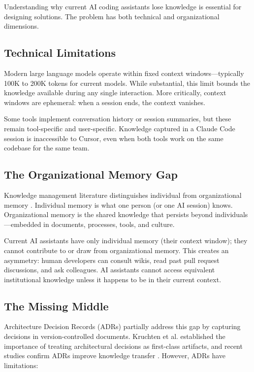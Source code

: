 \documentclass[10pt,journal,compsoc]{IEEEtran}
\begin{document}
Understanding why current AI coding assistants lose knowledge is essential for designing solutions. The problem has both technical and organizational dimensions.

\subsection{Technical Limitations}

Modern large language models operate within fixed context windows---typically 100K to 200K tokens for current models. While substantial, this limit bounds the knowledge available during any single interaction. More critically, context windows are ephemeral: when a session ends, the context vanishes.

Some tools implement conversation history or session summaries, but these remain tool-specific and user-specific. Knowledge captured in a Claude Code session is inaccessible to Cursor, even when both tools work on the same codebase for the same team.

\subsection{The Organizational Memory Gap}

Knowledge management literature distinguishes individual from organizational memory \cite{walsh1991organizational}. Individual memory is what one person (or one AI session) knows. Organizational memory is the shared knowledge that persists beyond individuals---embedded in documents, processes, tools, and culture.

Current AI assistants have only individual memory (their context window); they cannot contribute to or draw from organizational memory. This creates an asymmetry: human developers can consult wikis, read past pull request discussions, and ask colleagues. AI assistants cannot access equivalent institutional knowledge unless it happens to be in their current context.

\subsection{The Missing Middle}

Architecture Decision Records (ADRs) \cite{nygard2011adr} partially address this gap by capturing decisions in version-controlled documents. Kruchten et al. \cite{kruchten2006decision} established the importance of treating architectural decisions as first-class artifacts, and recent studies confirm ADRs improve knowledge transfer \cite{soldani2024adr,tofan2023adr}. However, ADRs have limitations:
\end{document}

